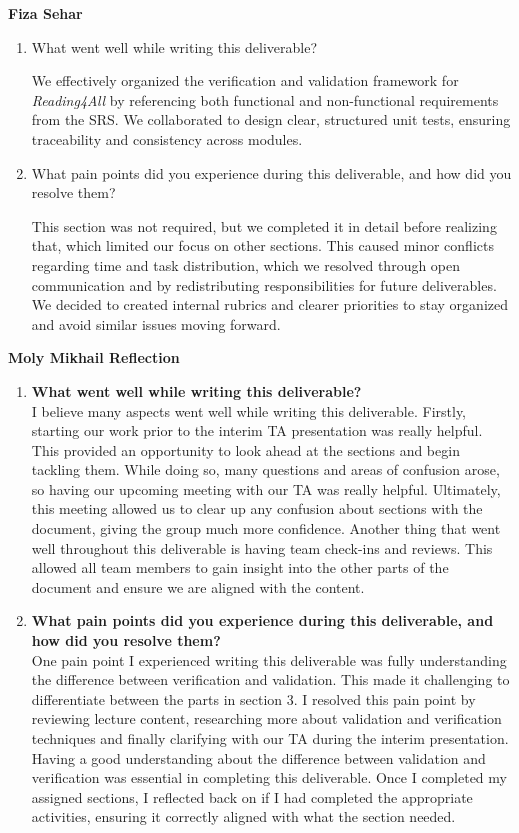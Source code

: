 \documentclass[12pt, titlepage]{article}
\begin{document}
\textbf{Fiza Sehar}
\begin{enumerate}
\item What went well while writing this deliverable?

  We effectively organized the verification and validation framework
  for \textit{Reading4All} by referencing both functional and
  non-functional requirements from the SRS. We collaborated to design
  clear, structured unit tests, ensuring traceability and consistency
  across modules.

\item What pain points did you experience during this deliverable,
  and how did you resolve them?

  This section was not required, but we completed it in detail before
  realizing that, which limited our focus on other sections. This
  caused minor conflicts regarding time and task distribution, which
  we resolved through open communication and by redistributing
  responsibilities for future deliverables. We decided to created
  internal rubrics and clearer priorities to stay organized and avoid
  similar issues moving forward.

\end{enumerate}


\textbf{Moly Mikhail Reflection}
\begin{enumerate}
  \item \textbf{What went well while writing this deliverable?}\\
  I believe many aspects went well while writing this deliverable. Firstly, starting our work prior to the interim TA presentation was really helpful. 
  This provided an opportunity to look ahead at the sections and begin tackling them. While doing so, many questions and areas of confusion arose, so having our upcoming meeting with our TA was really helpful. 
  Ultimately, this meeting allowed us to clear up any confusion about sections with the document, giving the group much more confidence. Another thing that went well throughout this deliverable is having team check-ins and reviews. 
  This allowed all team members to gain insight into the other parts of the document and ensure we are aligned with the content.
  \item \textbf{What pain points did you experience during this deliverable, and how
    did you resolve them?}\\
  One pain point I experienced writing this deliverable was fully understanding the difference between verification and validation. This made it challenging to differentiate between the parts in section 3.
  I resolved this pain point by reviewing lecture content, researching more about validation and verification techniques and finally clarifying with our TA during the interim presentation. 
  Having a good understanding about the difference between validation and verification was essential in completing this deliverable. Once I completed 
  my assigned sections, I reflected back on if I had completed the appropriate activities, ensuring it correctly aligned with what the section needed. 
\end{enumerate}
\end{document}
